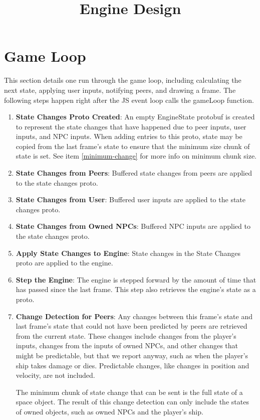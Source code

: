 \documentclass{article}
\title{Engine Design}
\begin{document}
\maketitle

\section{Game Loop}
This section details one run through the game loop, including calculating the next state, applying user inputs, notifying peers, and drawing a frame. The following steps happen right after the JS event loop calls the gameLoop function.
\begin{enumerate}
\item \textbf{State Changes Proto Created}: An empty EngineState protobuf is created to represent the state changes that have happened due to peer inputs, user inputs, and NPC inputs. When adding entries to this proto, state may be copied from the last frame's state to ensure that the minimum size chunk of state is set. See item \ref{minimum-change} for more info on minimum chunk size.

\item \textbf{State Changes from Peers}: Buffered state changes from peers are applied to the state changes proto. 
\item \textbf{State Changes from User}: Buffered user inputs are applied to the state changes proto.
\item \textbf{State Changes from Owned NPCs}: Buffered NPC inputs are applied to the state changes proto.
\item \textbf{Apply State Changes to Engine}: State changes in the State Changes proto are applied to the engine.
\item \textbf{Step the Engine}: The engine is stepped forward by the amount of time that has passed since the last frame. This step also retrieves the engine's state as a proto.
\item \label{minimum-change} \textbf{Change Detection for Peers}: Any changes between this frame's state and last frame's state that could not have been predicted by peers are retrieved from the current state. These changes include changes from the player's inputs, changes from the inputs of owned NPCs, and other changes that might be predictable, but that we report anyway, such as when the player's ship takes damage or dies. Predictable changes, like changes in position and velocity, are not included.

  The minimum chunk of state change that can be sent is the full state of a space object. The result of this change detection can only include the states of owned objects, such as owned NPCs and the player's ship.


\end{enumerate}
\end{document}
